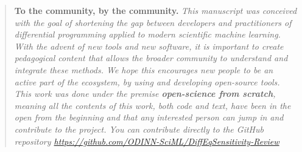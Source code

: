 
\begin{quote}
    \textbf{To the community, by the community.}
    \textit{This manuscript was conceived with the goal of shortening the gap between developers and practitioners of differential programming applied to  modern scientific machine learning. 
    With the advent of new tools and new software, it is important to create pedagogical content that allows the broader community to understand and integrate these methods. 
    We hope this encourages new people to be an active part of the ecosystem, by using and developing open-source tools. 
    This work was done under the premise \textbf{open-science from scratch}, meaning all the contents of this work, both code and text, have been in the open from the beginning and that any interested person can jump in and contribute to the project. 
    You can contribute directly to the GitHub repository \url{https://github.com/ODINN-SciML/DiffEqSensitivity-Review}
    }
\end{quote}